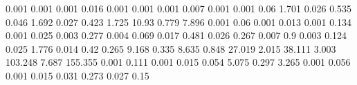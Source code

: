0.001      0.001      %
0.001      0.016      %
0.001      0.001      %
0.001      0.007      %
0.001      0.001      %
0.06       1.701      %
0.026      0.535      %
0.046      1.692      %
0.027      0.423      %
1.725      10.93      %
0.779      7.896      %
0.001      0.06       %
0.001      0.013      %
0.001      0.134      %
0.001      0.025      %
0.003      0.277      %
0.004      0.069      %
0.017      0.481      %
0.026      0.267      %
0.007      0.9        %
0.003      0.124      %
0.025      1.776      %
0.014      0.42       %
0.265      9.168      %
0.335      8.635      %
0.848      27.019     %
2.015      38.111     %
3.003      103.248    %
7.687      155.355    %
0.001      0.111      %
0.001      0.015      %
0.054      5.075      %
0.297      3.265      %
0.001      0.056      %
0.001      0.015      %
0.031      0.273      %
0.027      0.15       %
